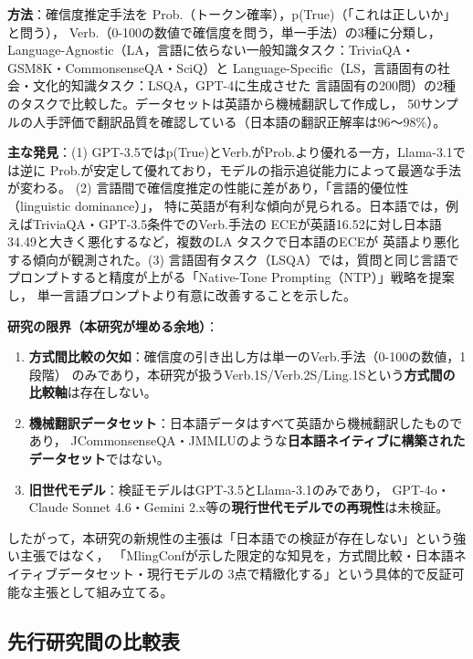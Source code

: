 \documentclass[11pt,a4paper,oneside]{article}
\begin{document}
\textbf{方法}：確信度推定手法を Prob.（トークン確率），p(True)（「これは正しいか」と問う），
Verb.（0-100の数値で確信度を問う，単一手法）の3種に分類し，
Language-Agnostic（LA，言語に依らない一般知識タスク：TriviaQA・GSM8K・CommonsenseQA・SciQ）と
Language-Specific（LS，言語固有の社会・文化的知識タスク：LSQA，GPT-4に生成させた
言語固有の200問）の2種のタスクで比較した。データセットは英語から機械翻訳して作成し，
50サンプルの人手評価で翻訳品質を確認している（日本語の翻訳正解率は96〜98\%）。

\textbf{主な発見}：(1) GPT-3.5ではp(True)とVerb.がProb.より優れる一方，Llama-3.1では逆に
Prob.が安定して優れており，モデルの指示追従能力によって最適な手法が変わる。
(2) 言語間で確信度推定の性能に差があり，「言語的優位性（linguistic dominance）」，
特に英語が有利な傾向が見られる。日本語では，例えばTriviaQA・GPT-3.5条件でのVerb.手法の
ECEが英語16.52に対し日本語34.49と大きく悪化するなど，複数のLA タスクで日本語のECEが
英語より悪化する傾向が観測された。(3) 言語固有タスク（LSQA）では，質問と同じ言語で
プロンプトすると精度が上がる「Native-Tone Prompting（NTP）」戦略を提案し，
単一言語プロンプトより有意に改善することを示した。

\textbf{研究の限界（本研究が埋める余地）}：
\begin{enumerate}
  \item \textbf{方式間比較の欠如}：確信度の引き出し方は単一のVerb.手法（0-100の数値，1段階）
        のみであり，本研究が扱うVerb.1S/Verb.2S/Ling.1Sという\textbf{方式間の比較軸}は存在しない。
  \item \textbf{機械翻訳データセット}：日本語データはすべて英語から機械翻訳したものであり，
        JCommonsenseQA・JMMLUのような\textbf{日本語ネイティブに構築されたデータセット}ではない。
  \item \textbf{旧世代モデル}：検証モデルはGPT-3.5とLlama-3.1のみであり，
        GPT-4o・Claude Sonnet 4.6・Gemini 2.x等の\textbf{現行世代モデルでの再現性}は未検証。
\end{enumerate}

したがって，本研究の新規性の主張は「日本語での検証が存在しない」という強い主張ではなく，
「MlingConfが示した限定的な知見を，方式間比較・日本語ネイティブデータセット・現行モデルの
3点で精緻化する」という具体的で反証可能な主張として組み立てる。

\subsection{先行研究間の比較表}
\end{document}
